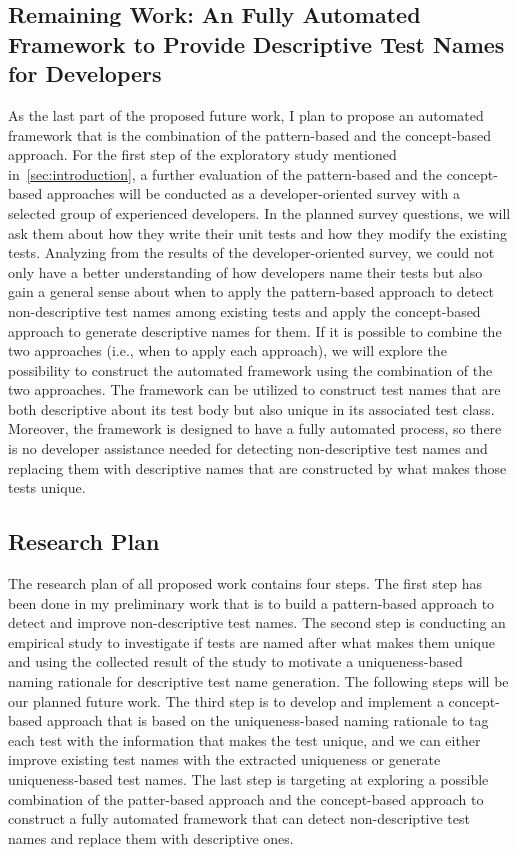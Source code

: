 \subsection{Remaining Work: An Fully Automated Framework to Provide Descriptive Test Names for Developers}
\label{sec:remaining-work2}

As the last part of the proposed future work, I plan to propose an automated framework that is the combination of the pattern-based and the concept-based approach.
%
For the first step of the exploratory study mentioned in~\cref{sec:introduction}, a further evaluation of the pattern-based and the concept-based approaches will be conducted as a developer-oriented survey with a selected group of experienced developers.
%
In the planned survey questions, we will ask them about how they write their unit tests and how they modify the existing tests.
%
Analyzing from the results of the developer-oriented survey, we could not only have a better understanding of how developers name their tests but also gain a general sense about when to apply the pattern-based approach to detect non-descriptive test names among existing tests and apply the concept-based approach to generate descriptive names for them.
%
If it is possible to combine the two approaches (i.e., when to apply each approach), we will explore the possibility to construct the automated framework using the combination of the two approaches.
%
The framework can be utilized to construct test names that are both descriptive about its test body but also unique in its associated test class.
%
Moreover, the framework is designed to have a fully automated process, so there is no developer assistance needed for detecting non-descriptive test names and replacing them with descriptive names that are constructed by what makes those tests unique.

\subsection{Research Plan}

The research plan of all proposed work contains four steps.
%
The first step has been done in my preliminary work that is to build a pattern-based approach to detect and improve non-descriptive test names.
%
The second step is conducting an empirical study to investigate if tests are named after what makes them unique and using the collected result of the study to motivate a uniqueness-based naming rationale for descriptive test name generation.
%
The following steps will be our planned future work.
%
The third step is to develop and implement a concept-based approach that is based on the uniqueness-based naming rationale to tag each test with the information that makes the test unique, and we can either improve existing test names with the extracted uniqueness or generate uniqueness-based test names.
%
The last step is targeting at exploring a possible combination of the patter-based approach and the concept-based approach to construct a fully automated framework that can detect non-descriptive test names and replace them with descriptive ones.